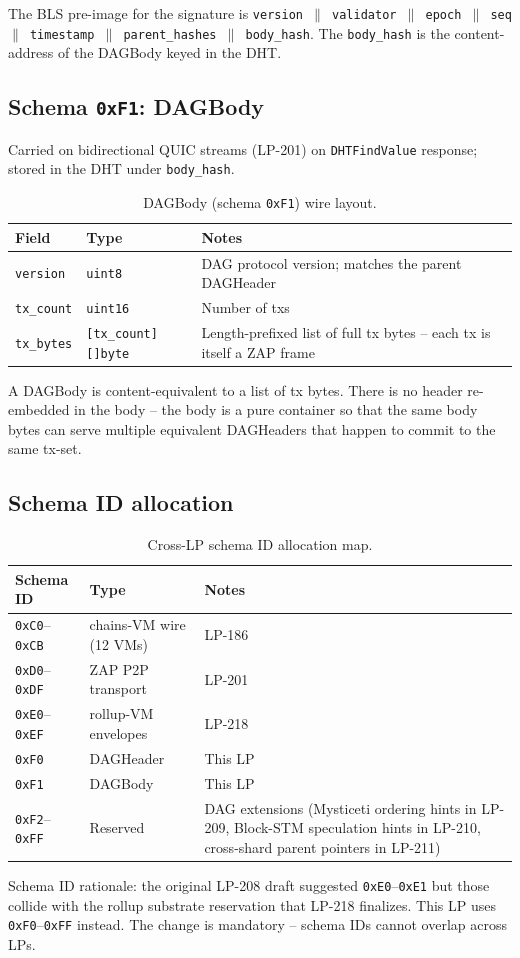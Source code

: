 The BLS pre-image for the signature is
\texttt{version $\|$ validator $\|$ epoch $\|$ seq $\|$ timestamp $\|$
parent\_hashes $\|$ body\_hash}. The \texttt{body\_hash} is the
content-address of the DAGBody keyed in the DHT.

\subsection{Schema \texttt{0xF1}: DAGBody}

Carried on bidirectional QUIC streams (LP-201) on
\texttt{DHTFindValue} response; stored in the DHT under
\texttt{body\_hash}.

\begin{table}[h]
\centering
\small
\begin{tabular}{@{}llp{7cm}@{}}
\toprule
\textbf{Field} & \textbf{Type} & \textbf{Notes} \\
\midrule
\texttt{version} & \texttt{uint8} & DAG protocol version; matches the parent DAGHeader \\
\texttt{tx\_count} & \texttt{uint16} & Number of txs \\
\texttt{tx\_bytes} & \texttt{[tx\_count][]byte} & Length-prefixed list of full tx bytes -- each tx is itself a ZAP frame \\
\bottomrule
\end{tabular}
\caption{DAGBody (schema \texttt{0xF1}) wire layout.}
\label{tab:dagbody}
\end{table}

A DAGBody is content-equivalent to a list of tx bytes. There is no
header re-embedded in the body -- the body is a pure container so
that the same body bytes can serve multiple equivalent DAGHeaders
that happen to commit to the same tx-set.

\subsection{Schema ID allocation}

\begin{table}[h]
\centering
\small
\begin{tabular}{@{}lll@{}}
\toprule
\textbf{Schema ID} & \textbf{Type} & \textbf{Notes} \\
\midrule
\texttt{0xC0}--\texttt{0xCB} & chains-VM wire (12 VMs) & LP-186 \\
\texttt{0xD0}--\texttt{0xDF} & ZAP P2P transport & LP-201 \\
\texttt{0xE0}--\texttt{0xEF} & rollup-VM envelopes & LP-218 \\
\texttt{0xF0} & DAGHeader & This LP \\
\texttt{0xF1} & DAGBody & This LP \\
\texttt{0xF2}--\texttt{0xFF} & Reserved & DAG extensions (Mysticeti ordering hints in LP-209, Block-STM speculation hints in LP-210, cross-shard parent pointers in LP-211) \\
\bottomrule
\end{tabular}
\caption{Cross-LP schema ID allocation map.}
\label{tab:schema-ids}
\end{table}

Schema ID rationale: the original LP-208 draft suggested
\texttt{0xE0}--\texttt{0xE1} but those collide with the rollup
substrate reservation that LP-218 finalizes. This LP uses
\texttt{0xF0}--\texttt{0xFF} instead. The change is mandatory --
schema IDs cannot overlap across LPs.
